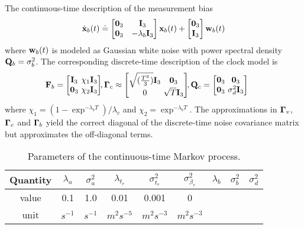 The continuous-time description of the measurement bias
\begin{align}
	\dot{\mathbf{x}}_b(t) \doteq 
	\begin{bmatrix}
		\boldsymbol{0}_3 & \mathbf{I}_3 \\ \boldsymbol{0}_3 & -\lambda_b \mathbf{I}_3
	\end{bmatrix} 
	\mathbf{x}_b(t) +
	\begin{bmatrix} \boldsymbol{0}_3 \\ \mathbf{I}_3 \end{bmatrix} \mathbf{w}_b(t)
\end{align}
where $\mathbf{w}_b(t)$ is modeled as Gaussian white noise with power spectral density $\mathbf{Q}_b = \sigma_b^2$. 
The corresponding discrete-time description of the clock model is 
\begin{align}
	& \dss \BoldF_b = 
	\begin{bmatrix}
		\BoldI_3 \dss & \chi_1 \BoldI_3 \\ \0_3 \dss & \chi_2 \BoldI_3
	\end{bmatrix} \ds,
	\BoldGamma_c \approx
	\begin{bmatrix}
		\sqrt{(\frac{T^3}{3})} \BoldI_{3} \dss & \0_3 \\
		0 \dss & \sqrt{T} \BoldI_3
	\end{bmatrix} \ds,  
	\BoldQ_{c} = 
	\begin{bmatrix}
		\0_3 \dss & \0_3 \\ \0_3 \dss & \sigma_{d}^2 \BoldI_3
	\end{bmatrix}
\end{align}
where $\chi_1 = (1 - \exp^{-\lambda_b T})/ \lambda_c$ and $\chi_2 = \exp^{-\lambda_b T}$.
The approximations in $\boldsymbol{\Gamma}_v$, $\boldsymbol{\Gamma}_c$ and $\boldsymbol{\Gamma}_b$ yield the correct diagonal of the discrete-time noise covariance matrix but approximates the off-diagonal terms.

\begin{table}[h!]
	\centering
	\begin{tabular}[h]{|c|c|c|c|c|c|c|c|c|}
		\hline
		Quantity & 	$\lambda_a$ & $\sigma_a^2$ & $\lambda_{t_r}$ & $\sigma_{t_r}^2$ & $\sigma_{\beta_r}^2$ & $\lambda_b$ & $\sigma_b^2$ &  $\sigma_d^2$ \T \\ \hline
		value	 &  0.1 & 1.0 & 0.01 & 0.001 & 0 & & &  \T \\ \hline
		unit	 &  $s^{-1}$ & $s^{-1}$ &  $m^2s^{-5}$ & $m^2s^{-3}$ & $m^2s^{-3}$ &  & & \T \\ \hline				
	\end{tabular}
	\caption{Parameters of the continuous-time Markov process.}
	\label{table:error_std_prediction}
\end{table}